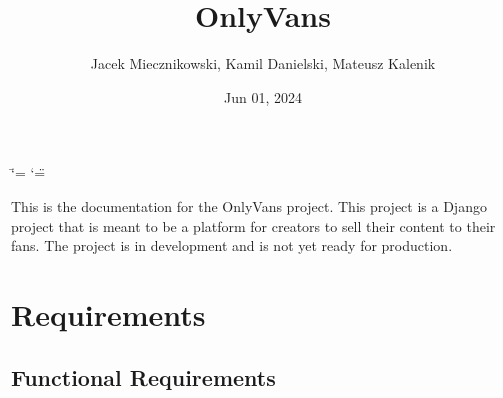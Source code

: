 \documentclass[letterpaper,10pt,english]{sphinxmanual}
\title{OnlyVans}
\date{Jun 01, 2024}
\author{Jacek Miecznikowski, Kamil Danielski, Mateusz Kalenik}
\begin{document}
\ifdefined\shorthandoff
  \ifnum\catcode`\=\string=\active\shorthandoff{=}\fi
  \ifnum\catcode`\"=\active{}\fi
\fi

\pagestyle{empty}
\sphinxmaketitle
\pagestyle{plain}
\sphinxtableofcontents
\pagestyle{normal}
\label{\detokenize{index::doc}}


\sphinxAtStartPar
This is the documentation for the OnlyVans project. This project is a Django project that is meant to be a platform for creators to sell their content to their fans. The project is  in development and is not yet ready for production.

\sphinxstepscope


\chapter{Requirements}
\label{\detokenize{modules/requirements:requirements}}\label{\detokenize{modules/requirements::doc}}

\section{Functional Requirements}
\label{\detokenize{modules/requirements:functional-requirements}}
\end{document}
